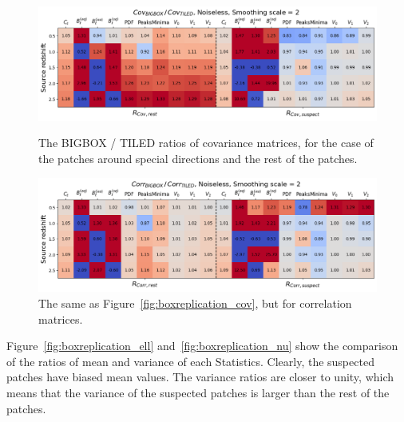 \begin{figure}[ht]
    \centering
    \includegraphics[width=\textwidth]{figures/BR_ratio_cov.png}
    \caption{The BIGBOX / TILED ratios of covariance matrices, for the case of the patches around special directions and the rest of the patches. }
    \label{fig:boxreplication_cov}
    \includegraphics[width=\textwidth]{figures/BR_ratio_corr.png}
    \caption{The same as Figure~\ref{fig:boxreplication_cov}, but for correlation matrices.}
    \label{fig:boxreplication_corr}
\end{figure}

Figure~\ref{fig:boxreplication_ell} and~\ref{fig:boxreplication_nu} show the comparison of the ratios of mean and variance of each Statistics. Clearly, the suspected patches have biased mean values. The variance ratios are closer to unity, which means that the variance of the suspected patches is larger than the rest of the patches.

